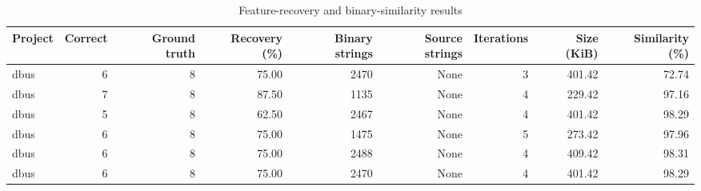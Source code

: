 \begin{table}[htbp]
\centering
\caption{Feature-recovery and binary-similarity results}
\label{tab:feature-recovery-results}
\small
\begin{tabular}{lrrrrrrrr}
\toprule
Project & Correct & Ground truth & Recovery (\%) & Binary strings & Source strings & Iterations & Size (KiB) & Similarity (\%) \\
\midrule
dbus & 6 & 8 & 75.00 & 2470 & None & 3 & 401.42 & 72.74 \\
dbus & 7 & 8 & 87.50 & 1135 & None & 4 & 229.42 & 97.16 \\
dbus & 5 & 8 & 62.50 & 2467 & None & 4 & 401.42 & 98.29 \\
dbus & 6 & 8 & 75.00 & 1475 & None & 5 & 273.42 & 97.96 \\
dbus & 6 & 8 & 75.00 & 2488 & None & 4 & 409.42 & 98.31 \\
dbus & 6 & 8 & 75.00 & 2470 & None & 4 & 401.42 & 98.29 \\
\bottomrule
\end{tabular}
\end{table}
